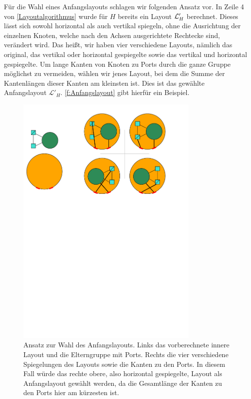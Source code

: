 Für die Wahl eines Anfangslayouts schlagen wir folgenden Ansatz vor.
In Zeile 4 von \autoref{Layoutalgorithmus} wurde für $H$ bereits ein Layout $\mathcal{L}'_H$ berechnet. 
Dieses lässt sich sowohl horizontal als auch vertikal spiegeln, ohne die Ausrichtung der einzelnen Knoten, welche nach den Achsen ausgerichtete Rechtecke sind, verändert wird.
Das heißt, wir haben vier verschiedene Layouts, nämlich das original, das vertikal oder horizontal gespiegelte sowie das vertikal und horizontal gespiegelte.
Um lange Kanten von Knoten zu Ports durch die ganze Gruppe möglichst zu vermeiden, wählen wir jenes Layout,
bei dem die Summe der Kantenlängen dieser Kanten am kleinsten ist. Dies ist das gewählte Anfangslayout $\mathcal{L}'_H$.
\autoref{f:Anfangslayout} gibt hierfür ein Beispiel.

\begin{figure}[h!]
\begin{center} 
  \includegraphics[width=0.8\textwidth]{Pics/Anfangslayout.pdf}
  \caption{Ansatz zur Wahl des Anfangslayouts. Links das vorberechnete innere Layout und die Elterngruppe mit Ports. Rechts die vier verschiedene Spiegelungen des Layouts sowie die Kanten zu den Ports.
  In diesem Fall würde das rechte obere, also horizontal gespiegelte, Layout als Anfangslayout gewählt werden, da die Gesamtlänge der Kanten zu den Ports hier am kürzesten ist.}
  \label{f:Anfangslayout}
\end{center}
\end{figure}


